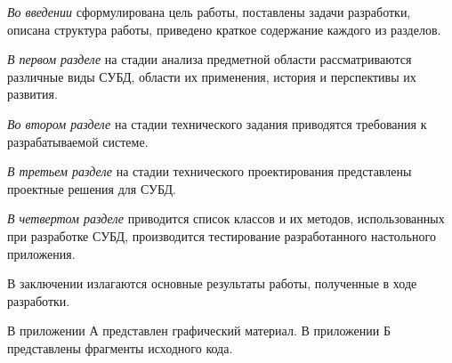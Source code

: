 \emph{Во введении} сформулирована цель работы, поставлены задачи разработки, описана структура работы, приведено краткое содержание каждого из разделов.

\emph{В первом разделе} на стадии анализа предметной области рассматриваются различные виды СУБД, области их применения, история и перспективы их развития.

\emph{Во втором разделе} на стадии технического задания приводятся требования к разрабатываемой системе.

\emph{В третьем разделе} на стадии технического проектирования представлены проектные решения для СУБД.

\emph{В четвертом разделе} приводится список классов и их методов, использованных при разработке СУБД, производится тестирование разработанного настольного приложения.

В заключении излагаются основные результаты работы, полученные в ходе разработки.

В приложении А представлен графический материал.
В приложении Б представлены фрагменты исходного кода. 
